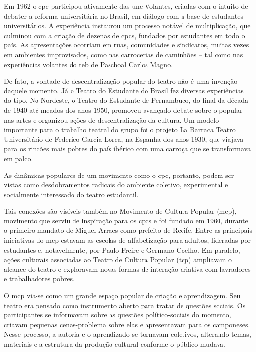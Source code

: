 Em 1962 o {\sc cpc} participou ativamente das {\sc une}-Volantes, criadas com o
intuito de debater a reforma universitária no Brasil, em diálogo com a
base de estudantes universitários. A experiência instaurou um processo
notável de multiplicação, que culminou com a criação de dezenas de {\sc cpc}s,
fundados por estudantes em todo o país. As apresentações ocorriam em
ruas, comunidades e sindicatos, muitas vezes em ambientes improvisados,
como nas carrocerias de caminhões -- tal como nas experiências volantes
do {\sc teb} de Paschoal Carlos Magno.

De fato, a vontade de descentralização popular do teatro não é uma
invenção daquele momento. Já o Teatro do Estudante do Brasil fez
diversas experiências do tipo. No Nordeste, o Teatro do Estudante de
Pernambuco, do final da década de 1940 até meados dos anos 1950,
promoveu avançado debate sobre o popular nas artes e organizou ações de
descentralização da cultura. Um modelo importante para o trabalho
teatral do grupo foi o projeto La Barraca Teatro Universitário de
Federico Garcia Lorca, na Espanha dos anos 1930, que viajava para os
rincões mais pobres do país ibérico com uma carroça que se transformava
em palco.

As dinâmicas populares de um movimento como o {\sc cpc}, portanto, podem ser
vistas como desdobramentos radicais do ambiente coletivo, experimental e
socialmente interessado do teatro estudantil.

Tais conexões são visíveis também no Movimento de Cultura Popular
({\sc mcp}), movimento que serviu de inspiração para os {\sc cpc}s e foi fundado em
1960, durante o primeiro mandato de Miguel Arraes como prefeito de
Recife. Entre as principais iniciativas do {\sc mcp} estavam as escolas de
alfabetização para adultos, lideradas por estudantes e, notavelmente,
por Paulo Freire e Germano Coelho. Em paralelo, ações culturais
associadas ao Teatro de Cultura Popular ({\sc tcp}) ampliavam o alcance do
teatro e exploravam novas formas de interação criativa com lavradores e
trabalhadores pobres.

O {\sc mcp} via-se como um grande espaço popular de criação e aprendizagem.
Seu teatro era pensado como instrumento aberto para tratar de questões
sociais. Os participantes se informavam sobre as questões
político-sociais do momento, criavam pequenas cenas-problema sobre elas
e apresentavam para os camponeses. Nesse processo, a autoria e o
aprendizado se tornavam coletivos, alterando temas, materiais e a
estrutura da produção cultural conforme o público mudava.

